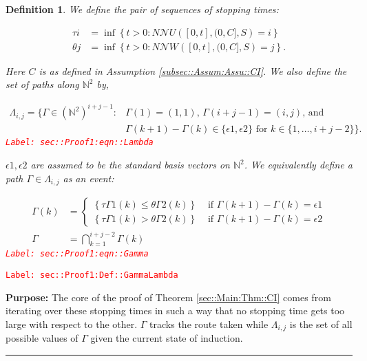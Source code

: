 \documentclass[12pt]{article}
\newcommand{\mb}{\mathbb}
\newcommand{\mc}{\mathcal}
\newcommand{\te}{\text}
\newcommand{\ep}{\epsilon}
\newcommand{\tr}{\textcolor{red}}
\newcommand{\labe}[1]{\tr{\texttt{Label: #1}}}
\newcommand{\purpose}{\textbf{Purpose: }}
\newcommand{\lin}{\rule{\linewidth}{0.4 pt}}
\renewcommand{\U}{U}							%
\newcommand{\UU}{W}								%
\renewcommand{\S}{S}							%
\newcommand{\ev}{\ep}							%
\renewcommand{\t}{t}							%
\newcommand{\neigh}{\mc{N}}						%
\newcommand{\const}{C}							%
\newcommand{\poiss}{N}							%
\newcommand{\rt}{\tau}							%
\newcommand{\rtt}{\theta}						%
\renewcommand{\it}{k}							%
\newcommand{\apath}{\Gamma}						%
\newcommand{\pathset}[2]{\Lambda_{#1,#2}}		%
\newtheorem{defn}[thms]{Definition}
\begin{document}
\begin{defn}
We define the pair of sequences of stopping times:

\begin{align*}
\rt{i} &= \inf \left\{\t > 0: \poiss{\neigh{\U}}\left([0,\t],(0,\const{}],\S\right) = i\right\}\\
\rtt{j} &= \inf \left\{\t > 0: \poiss{\neigh{\UU}}\left([0,\t],(0,\const{}],\S\right) = j\right\}.
\end{align*}

Here \(\const{}\) is as defined in Assumption \ref{subsec::Assum:Assu::CI}. We also define the set of paths along \(\mb{N}^2\) by,

\begin{align}
\pathset{i}{j} = \{\apath{} \in (\mb{N}^2)^{i+j-1}: &\apath{}(1) = (1,1)\te{, } \apath{}(i+j-1) = (i,j)\te{, and } \nonumber\\
&\apath{}(\it+1) - \apath{}(\it)\in \{\ev{1},\ev{2}\}\te{ for }\it\in \{1,\dots, i+j-2\}\}.
\label{sec::Proof1:eqn::Lambda}
\end{align}
\labe{sec::Proof1:eqn::Lambda}

\(\ev{1},\ev{2}\) are assumed to be the standard basis vectors on \(\mb{N}^2\). We equivalently define a path \(\apath{} \in \pathset{i}{j}\) as an event:

\begin{align}
\apath{}(\it) &= \begin{cases}
\left\{\rt{\apath{1}(\it)} \leq \rtt{\apath{2}(\it)}\right\} &\te{ if } \apath{}(\it+1) - \apath{}(\it) = \ev{1}\\
\left\{\rt{\apath{1}(\it)} > \rtt{\apath{2}(\it)}\right\} &\te{ if } \apath{}(\it+1) - \apath{}(\it) = \ev{2}
\end{cases}\\
\apath{} &= \bigcap_{\it=1}^{i+j-2} \apath{}(\it)
\label{sec::Proof1:eqn::Gamma}
\end{align}
\labe{sec::Proof1:eqn::Gamma}
\label{sec::Proof1:Def::GammaLambda}
\end{defn}
\labe{sec::Proof1:Def::GammaLambda}

\purpose The core of the proof of Theorem \ref{sec::Main:Thm::CI} comes from iterating over these stopping times in such a way that no stopping time gets too large with respect to the other. \(\apath{}\) tracks the route taken while \(\pathset{i}{j}\) is the set of all possible values of \(\apath{}\) given the current state of induction.

\lin
\end{document}
